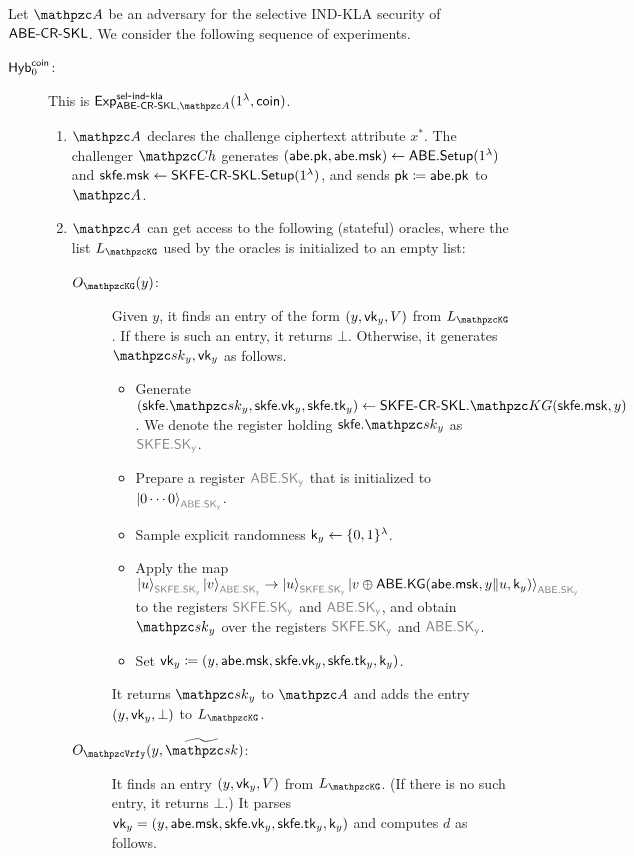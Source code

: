 Let $\qA$ be an adversary for the selective IND-KLA security of $\mathsf{ABE}\textrm{-}\mathsf{CR}\textrm{-}\mathsf{SKL}$.
We consider the following sequence of experiments.
\begin{description}
\item[$\mathsf{Hyb}_{0}^{\mathsf{coin}}$:]This is $\expc{\ABESKL,\qA}{sel}{ind}{kla}(1^\secp,\coin)$.
\begin{enumerate}
\item $\qA$ declares the challenge ciphertext attribute $x^*$. The
    challenger $\qCh$ generates $(\mathsf{abe}.\mathsf{pk},\mathsf{abe}.\mathsf{msk})\leftarrow\mathsf{ABE}.\mathsf{Setup}(1^\lambda)$ and $\mathsf{skfe}.\mathsf{msk}\leftarrow\mathsf{SKFE}\textrm{-}\mathsf{CR}\textrm{-}\mathsf{SKL}.\mathsf{Setup}(1^\lambda)$, and sends $\mathsf{pk}\coloneqq\mathsf{abe}.\mathsf{pk}$ to $\qA$.

\item $\qA$ can get access to the following (stateful) oracles, where the list $\List{\qKG}$ used by the oracles is initialized to an empty list:

\begin{description}
\item[$\Oracle{\qKG}(y)$:]Given $y$, it finds an entry of the form
$(y,\mathsf{vk}_y,V)$ from $\List{\qKG}$. If there is such an entry, it
returns $\bot$. Otherwise, it generates $\qsk_y, \vk_y$ as follows.

\begin{itemize}
\item Generate $(\skfe.\qsk_y,\skfe.\vk_y,\skfe.\tk_y)\gets\SKFESKL.\qKG(\skfe.\msk,y)$. We denote the register holding $\skfe.\qsk_y$ as $\qreg{SKFE.SK_y}$.

\item Prepare a register $\qreg{ABE.SK_y}$ that is initialized to $\ket{0\cdots0}_{\qreg{ABE.SK_y}}$.

\item Sample explicit randomness $\mathsf{k}_y \leftarrow \{0,1\}^\lambda$.

\item Apply the map
    $\ket{u}_{\qreg{SKFE.SK_y}}\ket{v}_{\qreg{ABE.SK_y}}\ra\ket{u}_{\qreg{SKFE.SK_y}}\ket{v\oplus\ABE.\KG(\abe.\msk,y\|u,\key_y)}_{\qreg{ABE.SK_y}}$ to the registers $\qreg{SKFE.SK_y}$ and $\qreg{ABE.SK_y}$, and obtain $\qsk_y$ over the registers $\qreg{SKFE.SK_y}$ and $\qreg{ABE.SK_y}$.

\item Set $\mathsf{vk}_y\coloneqq(y,\mathsf{abe}.\mathsf{msk},\mathsf{skfe}.\mathsf{vk}_y,\mathsf{skfe}.\mathsf{tk}_y, \mathsf{k}_y)$.
\end{itemize}
It returns $\qsk_y$ to $\qA$ and adds the entry $(y,\mathsf{vk}_y,\bot)$ to $\List{\qKG}$.
\item[
$\Oracle{\qVrfy}(y,\widetilde{\qsk})$:] It finds an entry
$(y,\mathsf{vk}_y,V)$ from $\List{\qKG}$. (If there is no such entry, it
returns $\bot$.) It parses
$\mathsf{vk}_y=(y,\mathsf{abe}.\mathsf{msk},\mathsf{skfe}.\mathsf{vk}_y,\mathsf{skfe}.\mathsf{tk}_y,\mathsf{k}_y)$ and computes
$d$ as follows.  


\end{description}
\end{enumerate}
\end{description}
